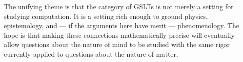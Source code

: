 The unifying theme is that the category of GSLTs is not merely
a setting for studying computation.
It is a setting rich enough to ground physics, epistemology, and
--- if the arguments here have merit --- phenomenology.
The hope is that making these connections mathematically precise
will eventually allow questions about the nature of mind to be
studied with the same rigor currently applied to questions about
the nature of matter.

